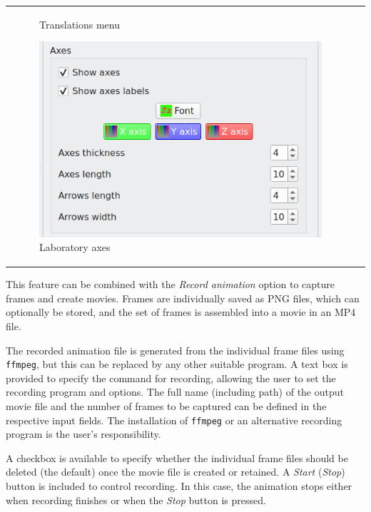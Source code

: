 \documentclass[10pt]{article}
\begin{document}
\begin{center}
\begin{tabular}{lr}
\begin{minipage}{.35\linewidth}
\begin{figure}[H]
\begin{center}
        \end{center}
        \vspace*{-1mm}
        \caption{Translations menu \label{fig:4_4_1}}
    \end{figure}
    \begin{figure}[H]
        \begin{center}
            \vspace*{-3mm}
            \includegraphics[width=0.6\linewidth]{damqt320_lab_axes.png}
        \end{center}
        \vspace*{-1mm}
        \caption{Laboratory axes \label{fig:4_5_1}}
    \end{figure}
\end{minipage}
\end{tabular}
\end{center}

This feature can be combined with the {\it Record animation}  
option to capture frames and create movies.  
Frames are individually saved as PNG files, which can optionally be stored, and the set of frames  
is assembled into a movie in an MP4 file.  

The recorded animation file is generated from the individual frame files using \texttt{ffmpeg},  
but this can be replaced by any other suitable program.  
A text box is provided to specify the command for recording, allowing the user to set the  
recording program and options.  
The full name (including path) of the output movie file and the number of frames to be captured  
can be defined in the respective input fields.  
The installation of \texttt{ffmpeg} or an alternative recording program is the user's responsibility.  

A checkbox is available to specify whether the individual frame files should be deleted  
(the default) once the movie file is created or retained.  
A {\it Start} ({\it Stop}) button is included to control recording.  
In this case, the animation stops either when recording finishes or when the {\it Stop} button is pressed.  
\end{document}

